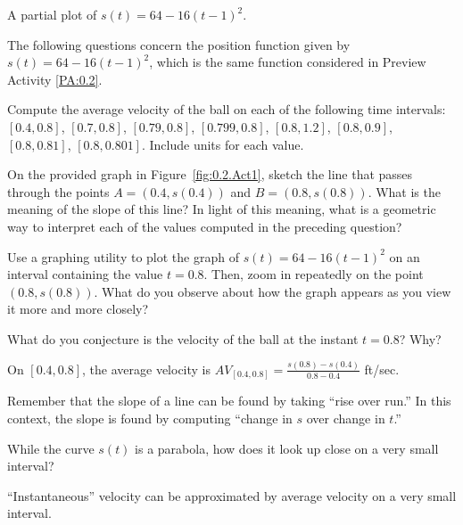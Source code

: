 \begin{marginfigure}[6cm] %
\caption{A partial plot of $s(t) = 64 - 16(t-1)^2$.} \label{fig:0.2.Act1}
\end{marginfigure}

\begin{activity} \label{A:0.2.1}  The following questions concern the position function given by $s(t) = 64 - 16(t-1)^2$, which is the same function considered in Preview Activity \ref{PA:0.2}.
\ba
	\item Compute the average velocity of the ball on each of the following time intervals: $[0.4,0.8]$, $[0.7,0.8]$, $[0.79, 0.8]$, $[0.799,0.8]$, $[0.8,1.2]$, $[0.8,0.9]$, $[0.8,0.81]$, $[0.8,0.801]$.  Include units for each value.
	\item On the provided graph in Figure~\ref{fig:0.2.Act1}, sketch the line that passes through the points $A=(0.4, s(0.4))$ and $B=(0.8, s(0.8))$.  What is the meaning of the slope of this line?  In light of this meaning, what is a geometric way to interpret each of the values computed in the preceding question?
	\item Use a graphing utility to plot the graph of $s(t) = 64 - 16(t-1)^2$ on an interval containing the value $t = 0.8$.  Then, zoom in repeatedly on the point $(0.8, s(0.8))$.  What do you observe about how the graph appears as you view it more and more closely?  
	\item What do you conjecture is the velocity of the ball at the instant $t = 0.8$?  Why?
\ea
\end{activity}
\begin{smallhint}
\ba
	\item On $[0.4,0.8]$, the average velocity is $AV_{[0.4,0.8]} = \frac{s(0.8)-s(0.4)}{0.8-0.4}$ ft/sec.
	\item Remember that the slope of a line can be found by taking ``rise over run.''  In this context, the slope is found by computing ``change in $s$ over change in $t$.''
	\item While the curve $s(t)$ is a parabola, how does it look up close on a very small interval? 
	\item ``Instantaneous'' velocity can be approximated by average velocity on a very small interval.
\ea
\end{smallhint}
